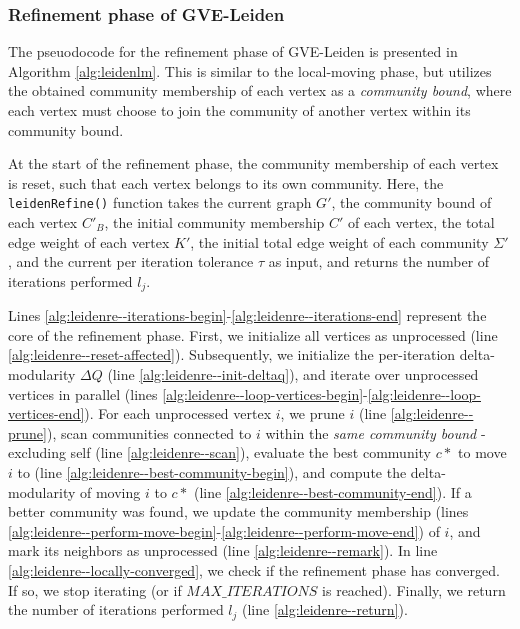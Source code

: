 \subsubsection{Refinement phase of GVE-Leiden}

The pseuodocode for the refinement phase of GVE-Leiden is presented in Algorithm \ref{alg:leidenlm}. This is similar to the local-moving phase, but utilizes the obtained community membership of each vertex as a \textit{community bound}, where each vertex must choose to join the community of another vertex within its community bound. At the start of the refinement phase, the community membership of each vertex is reset, such that each vertex belongs to its own community. Here, the \texttt{leidenRefine()} function takes the current graph $G'$, the community bound of each vertex $C'_B$, the initial community membership $C'$ of each vertex, the total edge weight of each vertex $K'$, the initial total edge weight of each community $\Sigma'$, and the current per iteration tolerance $\tau$ as input, and returns the number of iterations performed $l_j$.

Lines \ref{alg:leidenre--iterations-begin}-\ref{alg:leidenre--iterations-end} represent the core of the refinement phase. First, we initialize all vertices as unprocessed (line \ref{alg:leidenre--reset-affected}). Subsequently, we initialize the per-iteration delta-modularity $\Delta Q$ (line \ref{alg:leidenre--init-deltaq}), and iterate over unprocessed vertices in parallel (lines \ref{alg:leidenre--loop-vertices-begin}-\ref{alg:leidenre--loop-vertices-end}). For each unprocessed vertex $i$, we prune $i$ (line \ref{alg:leidenre--prune}), scan communities connected to $i$ within the \textit{same community bound} - excluding self (line \ref{alg:leidenre--scan}), evaluate the best community $c*$ to move $i$ to (line \ref{alg:leidenre--best-community-begin}), and compute the delta-modularity of moving $i$ to $c*$ (line \ref{alg:leidenre--best-community-end}). If a better community was found, we update the community membership (lines \ref{alg:leidenre--perform-move-begin}-\ref{alg:leidenre--perform-move-end}) of $i$, and mark its neighbors as unprocessed (line \ref{alg:leidenre--remark}). In line \ref{alg:leidenre--locally-converged}, we check if the refinement phase has converged. If so, we stop iterating (or if $MAX\_ITERATIONS$ is reached). Finally, we return the number of iterations performed $l_j$ (line \ref{alg:leidenre--return}).

